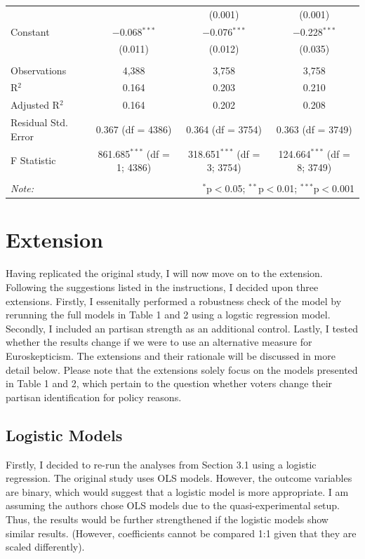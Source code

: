 \documentclass[12pt,letterpaper]{article}
\begin{document}
\begin{table}[H]
{\begin{tabular}{@{\extracolsep{5pt}}lccc}
				&  & (0.001) & (0.001) \\ 
				Constant & $-$0.068$^{***}$ & $-$0.076$^{***}$ & $-$0.228$^{***}$ \\ 
				& (0.011) & (0.012) & (0.035) \\ 
				\hline \\[-1.8ex] 
				Observations & 4,388 & 3,758 & 3,758 \\ 
				R$^{2}$ & 0.164 & 0.203 & 0.210 \\ 
				Adjusted R$^{2}$ & 0.164 & 0.202 & 0.208 \\ 
				Residual Std. Error & 0.367 (df = 4386) & 0.364 (df = 3754) & 0.363 (df = 3749) \\ 
				F Statistic & 861.685$^{***}$ (df = 1; 4386) & 318.651$^{***}$ (df = 3; 3754) & 124.664$^{***}$ (df = 8; 3749) \\ 
				\hline 
				\hline \\[-1.8ex] 
				\textit{Note:}  & \multicolumn{3}{r}{$^{*}$p$<$0.05; $^{**}$p$<$0.01; $^{***}$p$<$0.001} \\ 
			\end{tabular}%
		}
	\end{table}
	
	\section{Extension}
	Having replicated the original study, I will now move on to the extension. Following the suggestions listed in the instructions, I decided upon three extensions. Firstly, I essenitally performed a robustness check of the model by rerunning the full models in Table 1 and 2 using a logstic regression model. Secondly, I included an partisan strength as an additional control. Lastly, I tested whether the results change if we were to use an alternative measure for Euroskepticism. The extensions and their rationale will be discussed in more detail below. Please note that the extensions solely focus on the models presented in Table 1 and 2, which pertain to the question whether voters change their partisan identification for policy reasons. 
	
	\subsection{Logistic Models}
	Firstly, I decided to re-run the analyses from Section 3.1 using a logistic regression. The original study uses OLS models. However, the outcome variables are binary, which would suggest that a logistic model is more appropriate. I am assuming the authors chose OLS models due to the quasi-experimental setup. Thus, the results would be further strengthened if the logistic models show similar results. (However, coefficients cannot be compared 1:1 given that they are scaled differently).
	
\end{document}
